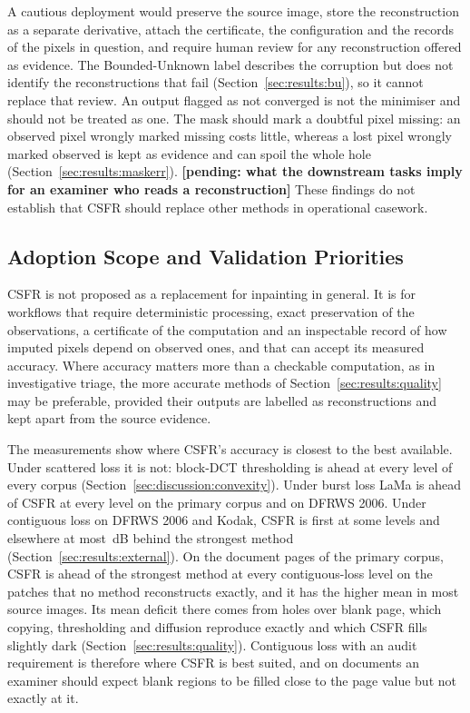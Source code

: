 \documentclass[final,3p]{elsarticle}
\newcommand{\resultpending}[1]{\textbf{[pending: #1]}}
\begin{document}
A cautious deployment would preserve the source image, store the reconstruction as a separate derivative, attach the certificate, the configuration and the records of the pixels in question, and require human review for any reconstruction offered as evidence. The Bounded-Unknown label describes the corruption but does not identify the reconstructions that fail (Section~\ref{sec:results:bu}), so it cannot replace that review. An output flagged as not converged is not the minimiser and should not be treated as one. The mask should mark a doubtful pixel missing: an observed pixel wrongly marked missing costs little, whereas a lost pixel wrongly marked observed is kept as evidence and can spoil the whole hole (Section~\ref{sec:results:maskerr}). \resultpending{what the downstream tasks imply for an examiner who reads a reconstruction} These findings do not establish that CSFR should replace other methods in operational casework.

\subsection{Adoption Scope and Validation Priorities}
\label{sec:discussion:scope}

CSFR is not proposed as a replacement for inpainting in general. It is for workflows that require deterministic processing, exact preservation of the observations, a certificate of the computation and an inspectable record of how imputed pixels depend on observed ones, and that can accept its measured accuracy. Where accuracy matters more than a checkable computation, as in investigative triage, the more accurate methods of Section~\ref{sec:results:quality} may be preferable, provided their outputs are labelled as reconstructions and kept apart from the source evidence.

The measurements show where CSFR's accuracy is closest to the best available. Under scattered loss it is not: block-DCT thresholding is ahead at every level of every corpus (Section~\ref{sec:discussion:convexity}). Under burst loss LaMa is ahead of CSFR at every level on the primary corpus and on DFRWS 2006. Under contiguous loss on DFRWS 2006 and Kodak, CSFR is first at some levels and elsewhere at most \qDfrwsCFthreeBehindMax\,dB behind the strongest method (Section~\ref{sec:results:external}). On the document pages of the primary corpus, CSFR is ahead of the strongest method at every contiguous-loss level on the patches that no method reconstructs exactly, and it has the higher mean in most source images. Its mean deficit there comes from holes over blank page, which copying, thresholding and diffusion reproduce exactly and which CSFR fills slightly dark (Section~\ref{sec:results:quality}). Contiguous loss with an audit requirement is therefore where CSFR is best suited, and on documents an examiner should expect blank regions to be filled close to the page value but not exactly at it.
\end{document}
